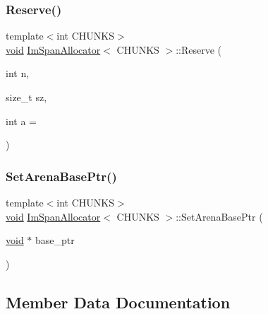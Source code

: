 \mbox{\label{structImSpanAllocator_a89b08935873f324a44642c9be7388004}} 
\subsubsection{\texorpdfstring{Reserve()}{Reserve()}}
{\footnotesize\ttfamily template$<$int C\+H\+U\+N\+KS$>$ \\
\hyperlink{imgui__impl__opengl3__loader_8h_ac668e7cffd9e2e9cfee428b9b2f34fa7}{void} \hyperlink{structImSpanAllocator}{Im\+Span\+Allocator}$<$ C\+H\+U\+N\+KS $>$\+::Reserve (\begin{DoxyParamCaption}\item[{int}]{n,  }\item[{size\+\_\+t}]{sz,  }\item[{int}]{a = {} }\end{DoxyParamCaption})\hspace{0.3cm}{\ttfamily [inline]}}

\mbox{\label{structImSpanAllocator_af379bb313a9dae91ee56093aa81d83f3}} 
\subsubsection{\texorpdfstring{Set\+Arena\+Base\+Ptr()}{SetArenaBasePtr()}}
{\footnotesize\ttfamily template$<$int C\+H\+U\+N\+KS$>$ \\
\hyperlink{imgui__impl__opengl3__loader_8h_ac668e7cffd9e2e9cfee428b9b2f34fa7}{void} \hyperlink{structImSpanAllocator}{Im\+Span\+Allocator}$<$ C\+H\+U\+N\+KS $>$\+::Set\+Arena\+Base\+Ptr (\begin{DoxyParamCaption}\item[{\hyperlink{imgui__impl__opengl3__loader_8h_ac668e7cffd9e2e9cfee428b9b2f34fa7}{void} $\ast$}]{base\+\_\+ptr }\end{DoxyParamCaption})\hspace{0.3cm}{\ttfamily [inline]}}



\subsection{Member Data Documentation}
\mbox{\label{structImSpanAllocator_a13ffffaa95637e4c95d215414f9600fd}} 
